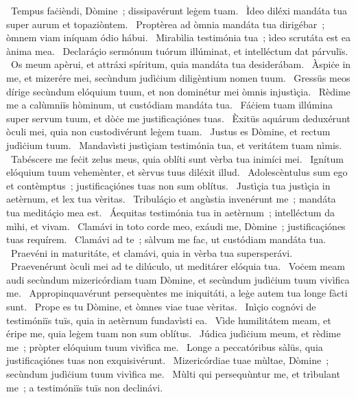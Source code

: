 {~Tempus faċièndi, Dòmine~; dissipavérunt leġem tuam. 
~Ìdeo diléxi mandáta tua super aurum et topaziòntem. 
~Proptèrea ad òmnia mandáta tua dirigébar~; òmnem viam iníquam ódio hábui. 
~Mirabìlia testimónia tua~; ìdeo scrutáta est ea ànima mea. 
~Declaráçio sermónum tuórum illúminat, et intelléctum dat párvulïs. 
~Os meum apèrui, et attráxi spíritum, quia mandáta tua desiderábam. 
~Àspiċe in me, et mizerére mei, secùndum judìċium diligèntium nomen tuum. 
~Gressüs meos dírige secùndum elóquium tuum, et non dominétur mei òmnis injustìçia. 
~Rèdime me a calùmniïs hòminum, ut custódiam mandáta tua. 
~Fáċiem tuam illúmina super servum tuum, et dòċe me justificaçiónes tuas. 
~Èxitüs aquárum deduxérunt òculi mei, quia non custodivérunt leġem tuam. 
~Justus es Dòmine, et rectum judìċium tuum. 
~Mandavìsti justìçiam testimónia tua, et veritátem tuam nìmis. 
~Tabéscere me feċit zelus meus, quia oblíti sunt vèrba tua inimíci mei. 
~Ignítum elóquium tuum vehemènter, et sèrvus tuus diléxit illud. 
~Adolescèntulus sum ego et contèmptus~; justificaçiónes tuas non sum oblítus. 
~Justìçia tua justìçia in aetèrnum, et lex tua vèritas. 
~Tribuláçio et angùstia invenérunt me~; mandáta tua meditáçio mea est. 
~Áequitas testimónia tua in aetèrnum~; intelléctum da mìhi, et vivam. 
~Clamávi in toto corde meo, exáudi me, Dòmine~; justificaçiónes tuas requírem. 
~Clamávi ad te~; sàlvum me fac, ut custódiam mandáta tua. 
~Praevéni in maturitáte, et clamávi, quia in vèrba tua supersperávi. 
~Praevenérunt òculi mei ad te dilúculo, ut meditárer elóquia tua. 
~Voċem meam audi secùndum mizericórdiam tuam Dòmine, et secùndum judìċium tuum vivìfica me. 
~Appropinquavérunt persequèntes me iniquitáti, a leġe autem tua longe fàcti sunt. 
~Prope es tu Dòmine, et òmnes viae tuae vèritas. 
~Inìçio cognóvi de testimóniïs tuïs, quia in aetèrnum fundavìsti ea. 
~Vìde humilitátem meam, et éripe me, quia leġem tuam non sum oblítus. 
~Júdica judìċium meum, et rèdime me~; pròpter elóquium tuum vivìfica me. 
~Longe a peccatóribus sàlüs, quia justificaçiónes tuas non exquisivérunt. 
~Mizericórdiae tuae mùltae, Dòmine~; secùndum judìċium tuum vivìfica me. 
~Mùlti qui persequùntur me, et trìbulant me~; a testimóniïs tuïs non declinávi. 
}
